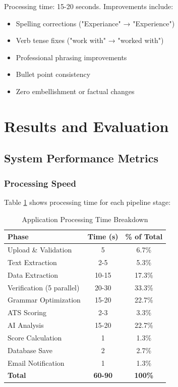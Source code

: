 \documentclass[conference]{IEEEtran}
\begin{document}
Processing time: 15-20 seconds. Improvements include:
\begin{itemize}
    \item Spelling corrections ("Experiance" → "Experience")
    \item Verb tense fixes ("work with" → "worked with")
    \item Professional phrasing improvements
    \item Bullet point consistency
    \item Zero embellishment or factual changes
\end{itemize}

\section{Results and Evaluation}

\subsection{System Performance Metrics}

\subsubsection{Processing Speed}

Table \ref{tab:processing_time} shows processing time for each pipeline stage:

\begin{table}[h]
\centering
\caption{Application Processing Time Breakdown}
\label{tab:processing_time}
\begin{tabular}{@{}lcc@{}}
\toprule
\textbf{Phase} & \textbf{Time (s)} & \textbf{\% of Total} \\ \midrule
Upload \& Validation & 5 & 6.7\% \\
Text Extraction & 2-5 & 5.3\% \\
Data Extraction & 10-15 & 17.3\% \\
Verification (5 parallel) & 20-30 & 33.3\% \\
Grammar Optimization & 15-20 & 22.7\% \\
ATS Scoring & 2-3 & 3.3\% \\
AI Analysis & 15-20 & 22.7\% \\
Score Calculation & 1 & 1.3\% \\
Database Save & 2 & 2.7\% \\
Email Notification & 1 & 1.3\% \\ \midrule
\textbf{Total} & \textbf{60-90} & \textbf{100\%} \\ \bottomrule
\end{tabular}
\end{table}
\end{document}
